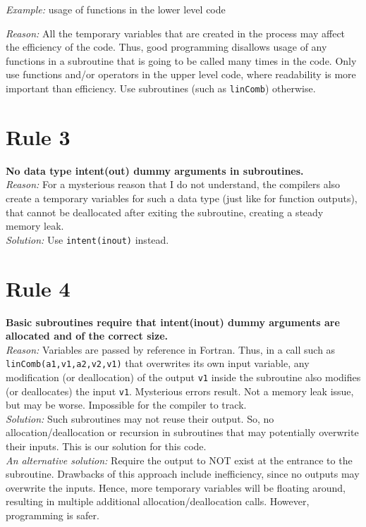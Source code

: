 \documentclass[12pt]{article}
\begin{document}
\emph{Example:} usage of functions in the lower level code

\emph{Reason:} All the temporary variables that are created in the
process may affect the efficiency of the code. Thus, good
programming disallows usage of any functions in a subroutine that is
going to be called many times in the code. Only use functions and/or
operators in the upper level code, where readability is more
important than efficiency. Use subroutines (such as \verb"linComb")
otherwise.


\section*{Rule 3} \textbf{No data type intent(out) dummy arguments
in subroutines.}\\

\emph{Reason:} For a mysterious reason that I do not understand, the
compilers also create a temporary variables for such a data type
(just like for function outputs), that cannot be deallocated after
exiting the subroutine, creating a steady memory leak.\\

\emph{Solution:} Use \verb"intent(inout)" instead.


\section*{Rule 4} \textbf{Basic subroutines require that
intent(inout) dummy arguments are allocated and of the correct
size.}\\

\emph{Reason:} Variables are passed by reference in Fortran. Thus,
in a call such as \verb"linComb(a1,v1,a2,v2,v1)" that overwrites its
own input variable, any modification (or deallocation) of the output
\verb"v1" inside the subroutine also modifies (or deallocates) the
input \verb"v1". Mysterious errors result. Not a memory leak issue,
but may be worse. Impossible for
the compiler to track.\\

\emph{Solution:} Such subroutines may not reuse their output. So, no
allocation/deallocation or recursion in subroutines that may
potentially overwrite their inputs. This is our solution for this
code.\\

\emph{An alternative solution:} Require the output to NOT exist at
the entrance to the subroutine. Drawbacks of this approach include
inefficiency, since no outputs may overwrite the inputs. Hence, more
temporary variables will be floating around, resulting in multiple
additional allocation/deallocation calls. However, programming is
safer.
\end{document}
